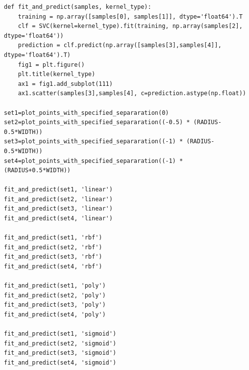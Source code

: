 \documentclass[paper=a4, fontsize=11pt]{scrartcl} %
\numberwithin{equation}{section} %
\numberwithin{figure}{section} %
\numberwithin{table}{section} %
\begin{document}
\begin{lstlisting}
def fit_and_predict(samples, kernel_type):
    training = np.array([samples[0], samples[1]], dtype='float64').T
    clf = SVC(kernel=kernel_type).fit(training, np.array(samples[2], dtype='float64'))
    prediction = clf.predict(np.array([samples[3],samples[4]], dtype='float64').T)
    fig1 = plt.figure()
    plt.title(kernel_type)
    ax1 = fig1.add_subplot(111)
    ax1.scatter(samples[3],samples[4], c=prediction.astype(np.float))

set1=plot_points_with_specified_separaration(0)
set2=plot_points_with_specified_separaration((-0.5) * (RADIUS-0.5*WIDTH))
set3=plot_points_with_specified_separaration((-1) * (RADIUS-0.5*WIDTH))
set4=plot_points_with_specified_separaration((-1) * (RADIUS+0.5*WIDTH))

fit_and_predict(set1, 'linear')
fit_and_predict(set2, 'linear')
fit_and_predict(set3, 'linear')
fit_and_predict(set4, 'linear')

fit_and_predict(set1, 'rbf')
fit_and_predict(set2, 'rbf')
fit_and_predict(set3, 'rbf')
fit_and_predict(set4, 'rbf')

fit_and_predict(set1, 'poly')
fit_and_predict(set2, 'poly')
fit_and_predict(set3, 'poly')
fit_and_predict(set4, 'poly')

fit_and_predict(set1, 'sigmoid')
fit_and_predict(set2, 'sigmoid')
fit_and_predict(set3, 'sigmoid')
fit_and_predict(set4, 'sigmoid')


\end{lstlisting}
\end{document}
